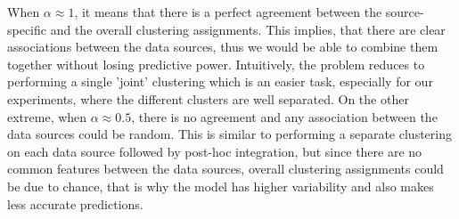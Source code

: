 When $\alpha \approx 1$, it means that there is a perfect agreement between the source-specific and the overall clustering assignments. This implies, that there are clear associations between the data sources, thus we would be able to combine them together without losing predictive power. Intuitively, the problem reduces to performing a single 'joint' clustering which is an easier task, especially for our experiments, where the different clusters are well separated. On the other extreme, when $\alpha \approx 0.5$, there is no agreement and any association between the data sources could be random. This is similar to performing a separate clustering on each data source followed by post-hoc integration, but since there are no common features between the data sources, overall clustering assignments could be due to chance, that is why the model has higher variability and also makes less accurate predictions. 